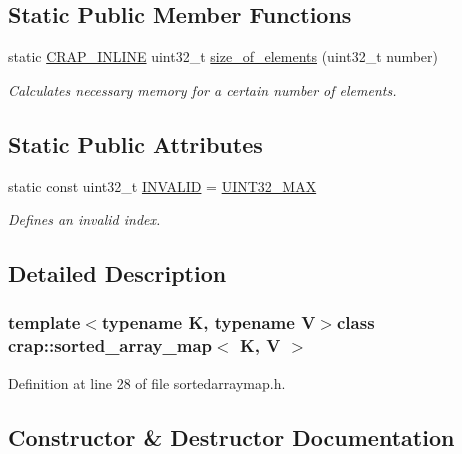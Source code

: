 \subsection*{Static Public Member Functions}
\begin{DoxyCompactItemize}
\item 
static \hyperlink{config__x86_8h_a5a40526b8d842e7ff731509998bb0f1c}{C\+R\+A\+P\+\_\+\+I\+N\+L\+I\+N\+E} uint32\+\_\+t \hyperlink{classcrap_1_1sorted__array__map_a9711c1ce96629b5f99999ced57c693e8}{size\+\_\+of\+\_\+elements} (uint32\+\_\+t number)
\begin{DoxyCompactList}\small\item\em Calculates necessary memory for a certain number of elements. \end{DoxyCompactList}\end{DoxyCompactItemize}
\subsection*{Static Public Attributes}
\begin{DoxyCompactItemize}
\item 
static const uint32\+\_\+t \hyperlink{classcrap_1_1sorted__array__map_a06a093e7319d7e543f47fbb5e0635a3a}{I\+N\+V\+A\+L\+I\+D} = \hyperlink{crap__types_8h_ab5eb23180f7cc12b7d6c04a8ec067fdd}{U\+I\+N\+T32\+\_\+\+M\+A\+X}
\begin{DoxyCompactList}\small\item\em Defines an invalid index. \end{DoxyCompactList}\end{DoxyCompactItemize}


\subsection{Detailed Description}
\subsubsection*{template$<$typename K, typename V$>$class crap\+::sorted\+\_\+array\+\_\+map$<$ K, V $>$}



Definition at line 28 of file sortedarraymap.\+h.



\subsection{Constructor \& Destructor Documentation}
\hypertarget{classcrap_1_1sorted__array__map_a9a233164617d4b4337942f07660f0c96}{}
